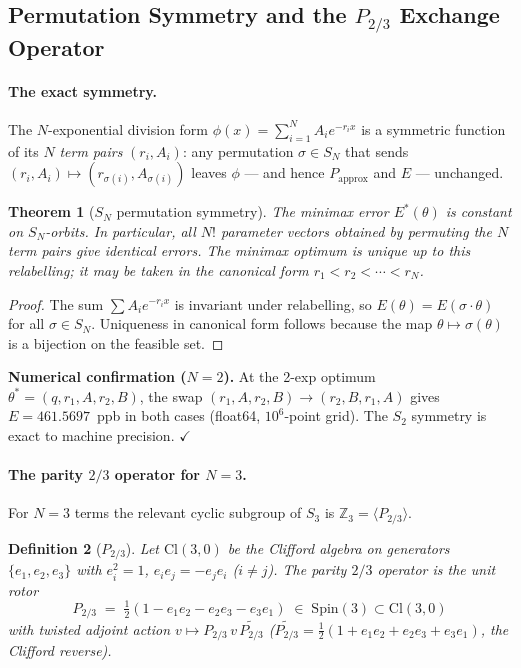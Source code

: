 \documentclass[12pt]{article}
\newtheorem{theorem}{Theorem}[section]
\newtheorem{definition}[theorem]{Definition}
\begin{document}
\subsection{Permutation Symmetry and the $P_{2/3}$ Exchange Operator}\label{sec:gluon}

\paragraph{The exact symmetry.}
The $N$-exponential division form $\phi(x) = \sum_{i=1}^N A_i e^{-r_i x}$
is a symmetric function of its $N$ \emph{term pairs} $(r_i, A_i)$: any permutation
$\sigma \in S_N$ that sends $(r_i,A_i)\mapsto(r_{\sigma(i)},A_{\sigma(i)})$ leaves
$\phi$ --- and hence $P_{\mathrm{approx}}$ and $E$ --- unchanged.

\begin{theorem}[$S_N$ permutation symmetry]\label{thm:sn}
The minimax error $E^*(\theta)$ is constant on $S_N$-orbits.  In particular, all
$N!$ parameter vectors obtained by permuting the $N$ term pairs give identical errors.
The minimax optimum is unique up to this relabelling; it may be taken in the
\emph{canonical form} $r_1 < r_2 < \cdots < r_N$.
\end{theorem}

\begin{proof}
The sum $\sum A_i e^{-r_ix}$ is invariant under relabelling, so
$E(\theta) = E(\sigma\cdot\theta)$ for all $\sigma\in S_N$.
Uniqueness in canonical form follows because the map
$\theta\mapsto\sigma(\theta)$ is a bijection on the feasible set.
\end{proof}

\noindent\textbf{Numerical confirmation ($N=2$).}
At the 2-exp optimum $\theta^* = (q, r_1, A, r_2, B)$, the swap
$(r_1,A,r_2,B)\to(r_2,B,r_1,A)$ gives $E = 461.5697$~ppb in both cases
(float64, $10^6$-point grid).  The $S_2$ symmetry is exact to machine precision.
$\checkmark$

\paragraph{The parity $2/3$ operator for $N=3$.}
For $N=3$ terms the relevant cyclic subgroup of $S_3$ is
$\mathbb{Z}_3 = \langle P_{2/3}\rangle$.

\begin{definition}[$P_{2/3}$]\label{def:p23}
Let $\mathrm{Cl}(3,0)$ be the Clifford algebra on generators $\{e_1,e_2,e_3\}$ with
$e_i^2=1$, $e_ie_j=-e_je_i$ ($i\neq j$).  The \emph{parity $2/3$ operator} is the
unit rotor
\[
\boxed{P_{2/3} \;=\; \tfrac{1}{2}\!\left(1 - e_1e_2 - e_2e_3 - e_3e_1\right)
\;\in\; \mathrm{Spin}(3) \subset \mathrm{Cl}(3,0)}
\]
with twisted adjoint action $v \mapsto P_{2/3}\,v\,\widetilde{P_{2/3}}$
($\widetilde{P_{2/3}} = \tfrac{1}{2}(1+e_1e_2+e_2e_3+e_3e_1)$, the Clifford reverse).
\end{definition}
\end{document}
